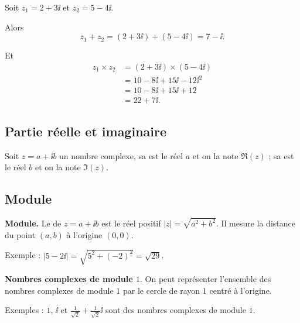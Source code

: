 \documentclass[11pt,class=report,crop=false]{standalone}
\begin{document}
 
  
\begin{exemple}
Soit $z_1 = 2+3\ii$ et $z_2 = 5-4\ii$.

Alors
$$z_1+ z_2 = (2+3\ii) + (5-4\ii) = 7 - \ii. $$
  
Et
\begin{align*}
z_1  \times z_2
  &= (2+3\ii) \times (5-4\ii) \\
  &= 10 -8\ii +15\ii -12\ii^2 \\
  &= 10 -8\ii +15\ii +12 \\ 
  &= 22 +7\ii.
\end{align*}


\end{exemple}

\subsection{Partie réelle et imaginaire}

Soit $z = a + \ii b$ un nombre complexe, sa  est le réel $a$ et on
la note $\Re(z)$ ;
sa  est le réel $b$ et on la note $\Im(z)$.






\subsection{Module}



\textbf{Module.}
Le  de $z = a + \ii b$ est le réel positif $|z| = \sqrt{a^2 + b^2}$. Il mesure la distance du point $(a,b)$ à l'origine $(0,0)$.

Exemple : $|5-2\ii| = \sqrt{5^2+(-2)^2} = \sqrt{29}$.

\textbf{Nombres complexes de module $1$}. 
On peut représenter l'ensemble des nombres complexes de module $1$ par le cercle de rayon $1$ centré à l'origine.


Exemples : $1$, $\ii$ et $\frac1{\sqrt2} + \frac1{\sqrt2}\ii$ sont des nombres complexes de module $1$.
\end{document}
